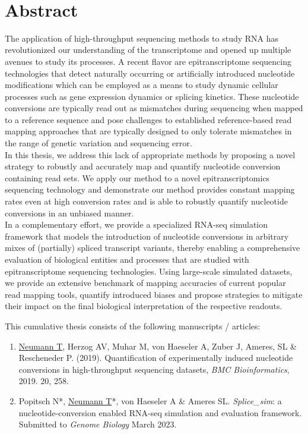 
~\vfill
\chapter*{Abstract}
The application of high-throughput sequencing methods to study RNA has revolutionized our understanding of the transcriptome and opened up multiple avenues to study its processes. A recent flavor are epitranscriptome sequencing technologies that detect naturally occurring or artificially introduced nucleotide modifications which can be employed as a means to study dynamic cellular processes such as gene expression dynamics or splicing kinetics. These nucleotide conversions are typically read out as mismatches during sequencing when mapped to a reference sequence and pose challenges to established reference-based read mapping approaches that are typically designed to only tolerate mismatches in the range of genetic variation and sequencing error. \\
In this thesis, we address this lack of appropriate methods by proposing a novel strategy to robustly and accurately map and quantify nucleotide conversion containing read sets. We apply our method to a novel epitranscriptomics sequencing technology and demonstrate our method provides constant mapping rates even at high conversion rates and is able to robustly quantify nucleotide conversions in an unbiased manner. \\
In a complementary effort, we provide a specialized RNA-seq simulation framework that models the introduction of nucleotide conversions in arbitrary mixes of (partially) spliced transcript variants, thereby enabling a comprehensive evaluation of biological entities and processes that are studied with epitranscriptome sequencing technologies. Using large-scale simulated datasets, we provide an extensive benchmark of mapping accuracies of current popular read mapping tools, quantify introduced biases and propose strategies to mitigate their impact on the final biological interpretation of the respective readouts.

\clearpage

This cumulative thesis consists of the following manuscripts / articles:

\begin{enumerate}[label=\roman*)]
\item \underline{Neumann T}, Herzog AV, Muhar M, von Haeseler A, Zuber J, Ameres, SL \& Rescheneder P. (2019). Quantification of experimentally induced nucleotide conversions in high-throughput sequencing datasets, \textit{BMC Bioinformatics}, 2019. 20, 258.
\item Popitsch N*, \underline{Neumann T}*, von Haeseler A \& Ameres SL. \textit{Splice\_sim}: a nucleotide-conversion enabled RNA-seq simulation and evaluation framework. Submitted to \textit{Genome Biology} March 2023.
\end{enumerate}

